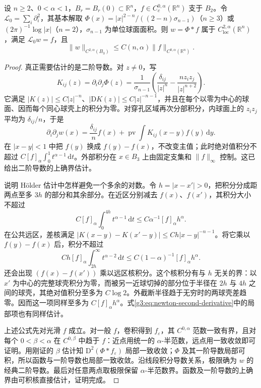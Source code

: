 \begin{lemma}\label{g3:lem:newton-holder-estimate}
	设 \(n\ge2\)、\(0<\alpha<1\)，\(B_r=B_r(0)\subset\mathbb R^n\)，\(f\in C_c^{0,\alpha}(\mathbb R^n)\) 支于 \(B_2\)。令 \(\mathcal L_0=\sum_i\partial_i^2\)，其基本解取 \(\Phi(x)=|x|^{2-n}/((2-n)\sigma_{n-1})\)（\(n\ge3\)）或 \((2\pi)^{-1}\log|x|\)（\(n=2\)），\(\sigma_{n-1}\) 为单位球面面积。则 \(w=\Phi*f\) 属于 \(C^{2,\alpha}_{\mathrm{loc}}(\mathbb R^n)\)，满足 \(\mathcal L_0w=f\)，且
	\[
		\|w\|_{C^{2,\alpha}(B_3)}
		\le C(n,\alpha)\|f\|_{C^{0,\alpha}(\mathbb R^n)}.
	\]
\end{lemma}
\begin{proof}
	真正需要估计的是二阶导数。对 \(z\ne0\)，写
	\[
		K_{ij}(z)=\partial_i\partial_j\Phi(z)
		=\frac1{\sigma_{n-1}}\left(\frac{\delta_{ij}}{|z|^n}
		-\frac{n z_i z_j}{|z|^{n+2}}\right).
	\]
	它满足 \(|K(z)|\le C|z|^{-n}\)、\(|\mathrm DK(z)|\le C|z|^{-n-1}\)，并且在每个以零为中心的球面、因而每个同心球壳上的积分为零。对穿孔区域再次分部积分，内球面上的 \(z_i z_j\) 平均为 \(\delta_{ij}/n\)，于是
	\begin{equation}\label{g3:eq:newton-second-derivative}
		\partial_i\partial_jw(x)
		=\frac{\delta_{ij}}n f(x)
		+\operatorname{pv}\int K_{ij}(x-y)f(y)\,\mathrm dy.
	\end{equation}
	在 \(|x-y|<1\) 中把 \(f(y)\) 换成 \(f(y)-f(x)\)，不改变主值；此时绝对值积分不超过
	\(C[f]_\alpha\int_0^1 t^{\alpha-1}\,\mathrm dt\)。外部积分在 \(x\in B_3\) 上由固定支集和 \(\|f\|_\infty\) 控制。这已给出二阶导数的上确界估计。

	说明 Hölder 估计中怎样避免一个多余的对数。令 \(h=|x-x'|>0\)，把积分分成距两点至多 \(3h\) 的部分和其余部分。在近区分别减去 \(f(x)\)、\(f(x')\)，其积分大小不超过
	\[
		C[f]_\alpha\int_0^{4h}t^{\alpha-1}\,\mathrm dt
		\le C\alpha^{-1}[f]_\alpha h^\alpha.
	\]
	在公共远区，差核满足
	\(|K(x-y)-K(x'-y)|\le Ch|x-y|^{-n-1}\)。将它乘以 \(f(y)-f(x)\) 后，积分不超过
	\[
		Ch[f]_\alpha\int_{2h}^{\infty}t^{\alpha-2}\,\mathrm dt
		\le C(1-\alpha)^{-1}[f]_\alpha h^\alpha.
	\]
	还会出现 \((f(x)-f(x'))\) 乘以远区核积分。这个核积分有与 \(h\) 无关的界：以 \(x'\) 为中心的完整球壳积分为零，而被另一近球切掉的部分位于半径在 \(2h\) 与 \(4h\) 之间的球壳，其绝对值积分至多为 \(C\log2\)。外截断半径趋于无穷时的两球壳差趋零。因而这一项同样至多为 \(C[f]_\alpha h^\alpha\)。式\eqref{g3:eq:newton-second-derivative}中的局部项也有同样估计。

	上述公式先对光滑 \(f\) 成立。对一般 \(f\)，卷积得到 \(f_\varepsilon\)，其 \(C^{0,\alpha}\) 范数一致有界，且对每个 \(0<\beta<\alpha\) 在 \(C^{0,\beta}\) 中趋于 \(f\)：近点用统一的 \(\alpha\)-半范数，远点用一致收敛即可证明。用刚证的 \(\beta\) 估计知 \(\mathrm D^2(\Phi*f_\varepsilon)\) 局部一致收敛；\(\Phi\) 及其一阶导数局部可积，所以函数与一阶导数也局部一致收敛。沿线段积分导数关系，极限确为 \(w\) 的经典二阶导数。最后对任意两点取极限保留 \(\alpha\)-半范数界。函数及一阶导数的上确界由可积核直接估计，证明完成。
\end{proof}

